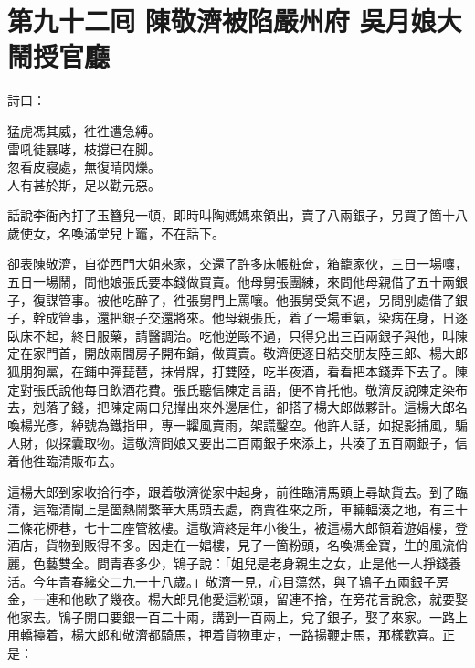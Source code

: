 
\chapter*{第九十二囘 陳敬濟被陷嚴州府 吳月娘大鬧授官廳}


詩曰：

\begin{myquote}
猛虎馮其威，徃徃遭急縛。\\雷吼徒暴哮，枝撐已在脚。\\忽看皮寢處，無復晴閃爍。\\人有甚於斯，足以勸元惡。
\end{myquote}

話說李衙內打了玉簪兒一頓，即時叫陶媽媽來領出，賣了八兩銀子，另買了箇十八歲使女，名喚滿堂兒上竈，不在話下。

卻表陳敬濟，自從西門大姐來家，交還了許多床帳粧奩，箱籠家伙，三日一場嚷，五日一場鬧，問他娘張氏要本錢做買賣。他母舅張團練，來問他母親借了五十兩銀子，復謀管事。被他吃醉了，徃張舅門上罵嚷。{}他張舅受氣不過，另問別處借了銀子，幹成管事，還把銀子交還將來。他母親張氏，着了一場重氣，染病在身，日逐臥床不起，終日服藥，請醫調治。吃他逆毆不過，只得兌出三百兩銀子與他，叫陳定在家門首，開啟兩間房子開布鋪，做買賣。敬濟便逐日結交朋友陸三郎、楊大郎狐朋狗黨，在鋪中彈琵琶，抹骨牌，打雙陸，吃半夜酒，看看把本錢弄下去了。陳定對張氏說他每日飲酒花費。張氏聽信陳定言語，便不肯托他。敬濟反說陳定染布去，剋落了錢，把陳定兩口兒攆出來外邊居住，卻搭了楊大郎做夥計。這楊大郎名喚楊光彥，綽號為鐵指甲，專一糶風賣雨，{}架謊鑿空。他許人話，如捉影捕風，騙人財，似探囊取物。這敬濟問娘又要出二百兩銀子來添上，共湊了五百兩銀子，信着他徃臨清販布去。

這楊大郎到家收拾行李，跟着敬濟從家中起身，前徃臨清馬頭上尋缺貨去。到了臨清，這臨清閘上是箇熱鬧繁華大馬頭去處，商賈徃來之所，車輛輻湊之地，有三十二條花桺巷，七十二座管絃樓。這敬濟終是年小後生，被這楊大郎領着遊娼樓，登酒店，貨物到販得不多。因走在一娼樓，見了一箇粉頭，名喚馮金寶，生的風流俏麗，色藝雙全。問青春多少，鴇子說：「姐兒是老身親生之女，止是他一人掙錢養活。今年青春纔交二九一十八歲。」敬濟一見，心目蕩然，與了鴇子五兩銀子房金，一連和他歇了幾夜。楊大郎見他愛這粉頭，留連不捨，在旁花言說念，就要娶他家去。鴇子開口要銀一百二十兩，講到一百兩上，兌了銀子，娶了來家。一路上用轎擡着，楊大郎和敬濟都騎馬，押着貨物車走，一路揚鞭走馬，那樣歡喜。正是：

